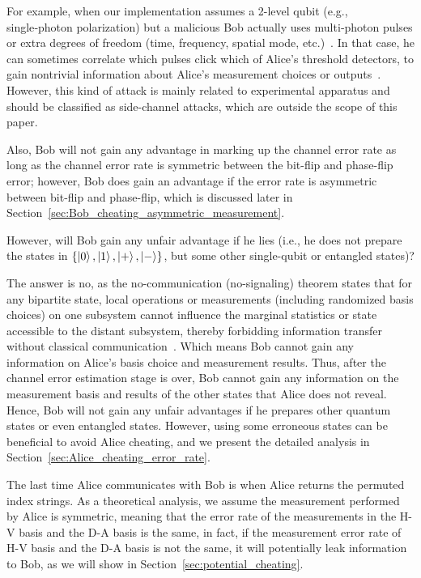 \documentclass[%
 reprint,
superscriptaddress,
 amsmath,amssymb,
 aps,
]{revtex4-2}
\begin{document}
For example, when our implementation assumes a 2-level qubit (e.g., single‑photon polarization) but a malicious Bob actually uses multi‑photon pulses or extra degrees of freedom (time, frequency, spatial mode, etc.)~\cite{Multiphoton_side_channel_attack1}. In that case, he can sometimes correlate which pulses click which of Alice’s threshold detectors, to gain nontrivial information about Alice’s measurement choices or outputs~\cite{Multiphoton_side_channel_attack1}. However, this kind of attack is mainly related to experimental apparatus and should be classified as side-channel attacks, which are outside the scope of this paper.

Also, Bob will not gain any advantage in marking up the channel error rate as long as the channel error rate is symmetric between the bit-flip and phase-flip error; however, Bob does gain an advantage if the error rate is asymmetric between bit-flip and phase-flip, which is discussed later in Section~\ref{sec:Bob_cheating_asymmetric_measurement}.

However, will Bob gain any unfair advantage if he lies (i.e., he does not prepare the states in $\{\ket{0}, \ket{1}, \ket{+}, \ket{-}\}$, but some other single-qubit or entangled states)?

The answer is no, as the no-communication (no-signaling) theorem states that for any bipartite state, local operations or measurements (including randomized basis choices) on one subsystem cannot influence the marginal statistics or state accessible to the distant subsystem, thereby forbidding information transfer without classical communication~\cite{No_signaling1, No_signaling2}. Which means Bob cannot gain any information on Alice's basis choice and measurement results. Thus, after the channel error estimation stage is over, Bob cannot gain any information on the measurement basis and results of the other states that Alice does not reveal. Hence, Bob will not gain any unfair advantages if he prepares other quantum states or even entangled states. However, using some erroneous states can be beneficial to avoid Alice cheating, and we present the detailed analysis in Section~\ref{sec:Alice_cheating_error_rate}.

The last time Alice communicates with Bob is when Alice returns the permuted index strings. As a theoretical analysis, we assume the measurement performed by Alice is symmetric, meaning that the error rate of the measurements in the H-V basis and the D-A basis is the same, in fact, if the measurement error rate of H-V basis and the D-A basis is not the same, it will potentially leak information to Bob, as we will show in Section~\ref{sec:potential_cheating}.
\end{document}
